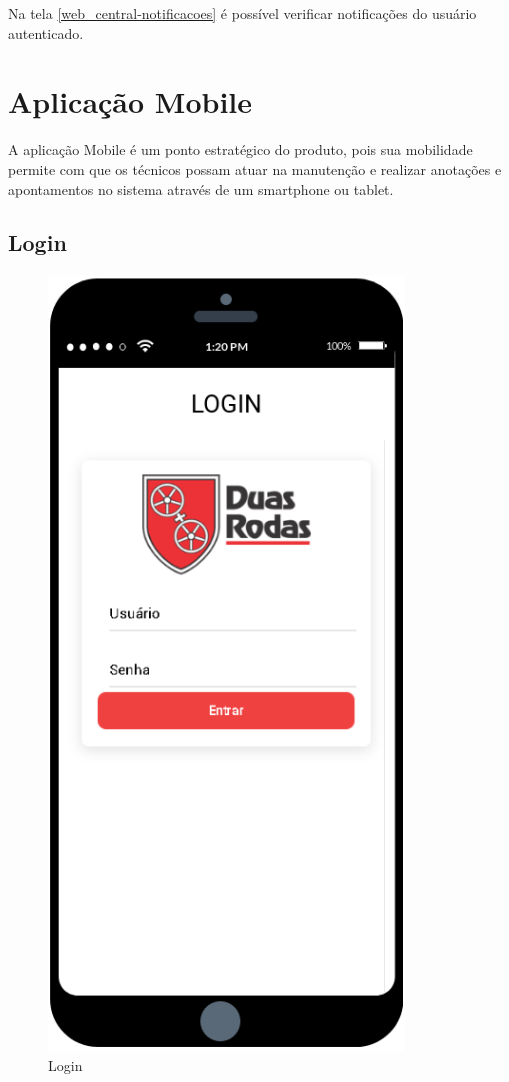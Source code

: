 Na tela \ref{web_central-notificacoes} é possível verificar notificações do usuário autenticado.

\newpage
\section{Aplicação Mobile}
A aplicação Mobile é um ponto estratégico do produto, pois sua mobilidade permite com que os técnicos possam atuar na manutenção e realizar anotações e apontamentos no sistema através de um smartphone ou tablet.

\subsection{Login}

\begin{figure}[htb]
	\caption{\label{mobile_login}Login}
	\begin{center}
		\includegraphics[scale=0.80]{./Figuras/mobile/login.png}
	\end{center}
\end{figure}

